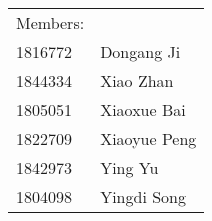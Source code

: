 
\begin{flushright}
\vspace{3cm}

\large \begin{tabular}{ll}
Members:&\\
1816772 & Dongang Ji \\
1844334 & Xiao Zhan \\
1805051 & Xiaoxue Bai\\
1822709 & Xiaoyue Peng\\
1842973 & Ying Yu\\
1804098 & Yingdi Song\\
\end{tabular}
 
\end{flushright}
